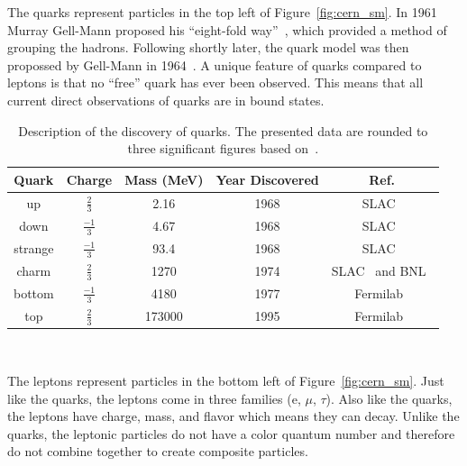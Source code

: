 The quarks represent particles in the top left of Figure~\ref{fig:cern_sm}.
In 1961 Murray Gell-Mann proposed his ``eight-fold way''~\citep{eightfold_way_osti_4008239}, which provided a method of grouping the hadrons.
Following shortly later, the quark model was then propossed by Gell-Mann in 1964~\citep{quark_model_GELLMANN1964214}.
A unique feature of quarks compared to leptons is that no ``free'' quark has ever been observed.
This means that all current direct observations of quarks are in bound states.

\begin{table}
\begin{center}
\begin{tabular}{||c c c c c||}
 \hline
 Quark & Charge & Mass (MeV) & Year Discovered & Ref.\\ [0.5ex]
 \hline\hline
 up & $\frac{2}{3}$ & 2.16 & 1968 & SLAC~\citep{1969PhRvL..23..930B, 1969PhRvL..23..935B} \\
 \hline
 down & $\frac{-1}{3}$ & 4.67 & 1968 & SLAC~\citep{1969PhRvL..23..930B, 1969PhRvL..23..935B} \\
 \hline
 strange & $\frac{-1}{3}$ & 93.4 & 1968 & SLAC~\citep{1969PhRvL..23..930B, 1969PhRvL..23..935B} \\
 \hline
 charm & $\frac{2}{3}$ & 1270 & 1974 & SLAC~\citep{augustin1974observation} and BNL~\citep{Jpsi_PhysRevLett.33.1404} \\
 \hline
 bottom & $\frac{-1}{3}$ & 4180 & 1977 & Fermilab~\citep{bottom_PhysRevLett.39.252}\\
 \hline
 top & $\frac{2}{3}$ & 173000 & 1995 & Fermilab~\citep{topquark_Abachi_1995} \\
 \hline
\end{tabular}
\caption{Description of the discovery of quarks.
  The presented data are rounded to three significant figures based on~\citep{Workman:2022ynf}.}
\end{center}
\end{table}
~\label{table:quark}

The leptons represent particles in the bottom left of Figure~\ref{fig:cern_sm}.
Just like the quarks, the leptons come in three families (e, $\mu$, $\tau$).
Also like the quarks, the leptons have charge, mass, and flavor which means they can decay.
Unlike the quarks, the leptonic particles do not have a color quantum number and therefore do not combine together to create composite particles.

